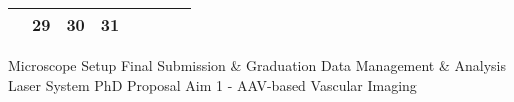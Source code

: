 {\begin{tabularx}{\linewidth}{|l!{\vrule width \myLenLineThicknessThick}*{7}{@{}X@{}|}}
       & 
    
      
      
        \begin{minipage}[t]{6mm}\centering{}29\end{minipage}
      
       & 
    
      
      
        \begin{minipage}[t]{6mm}\centering{}30\end{minipage}
      
       & 
    
      
      
        \begin{minipage}[t]{6mm}\centering{}31\end{minipage}
      
       & 
    
      
      
       & 
    
      
      
      
        \\  \hline 
      
    
  
  
  \end{tabularx}
}
\vfill{\centering{} \small{Microscope Setup}\hspace{1.5em} \small{Final Submission \& Graduation}\hspace{1.5em} \small{Data Management \& Analysis}\hspace{1.5em} \small{Laser System}\hspace{1.5em} \small{PhD Proposal}\hspace{1.5em} \small{Aim 1 - AAV-based Vascular Imaging}\hspace{1.5em}\par}

